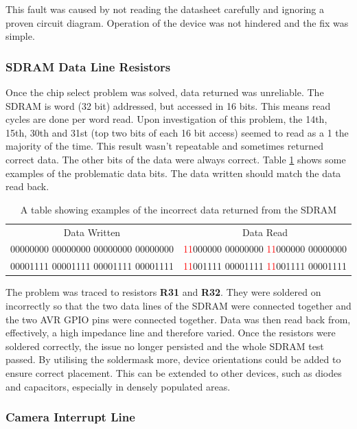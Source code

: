 This fault was caused by not reading the datasheet carefully and ignoring a proven circuit diagram. Operation of the device was not hindered and the fix was simple.

\subsubsection{SDRAM Data Line Resistors}
Once the chip select problem was solved, data returned was unreliable. The SDRAM is word (32 bit) addressed, but accessed in 16 bits. This means read cycles are done per word read. 
Upon investigation of this problem, the 14th, 15th, 30th and 31st (top two bits of each 16 bit access) seemed to read as a 1 the majority of the time. This result wasn't repeatable and sometimes returned correct data. The other bits of the data were always correct. Table \ref{table:SDRAM_Err} shows some examples of the problematic data bits. The data written should match the data read back. 

\begin{table}[!ht]
\caption{A table showing examples of the incorrect data returned from the SDRAM}
\label{table:SDRAM_Err}
\begin{tabular}{c c}
Data Written							&	Data Read \\
00000000 00000000 00000000 00000000		&	\textcolor{red}{11}000000 00000000 \textcolor{red}{11}000000 00000000 \\
00001111 00001111 00001111 00001111		&	\textcolor{red}{11}001111 00001111 \textcolor{red}{11}001111 00001111 \\
\end{tabular}
\end{table}

The problem was traced to resistors \textbf{R31} and \textbf{R32}. They were soldered on incorrectly so that the two data lines of the SDRAM were connected together and the two AVR GPIO pins were connected together. Data was then read back from, effectively, a high impedance line and therefore varied. Once the resistors were soldered correctly, the issue no longer persisted and the whole SDRAM test passed. By utilising the soldermask more, device orientations could be added to ensure correct placement. This can be extended to other devices, such as diodes and capacitors, especially in densely populated areas. 

\subsubsection{Camera Interrupt Line}

